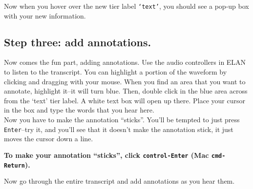\documentclass[letterpaper,12pt]{article}
\begin{document}
\noindent Now when you hover over the new tier label \texttt{`text'}, you should see a pop-up box with your new information.

\subsection*{Step three: add annotations.}
Now comes the fun part, adding annotations. Use the audio controllers in ELAN to listen to the transcript. You can highlight a portion of the waveform by clicking and dragging with your mouse. When you find an area that you want to annotate, highlight it--it will turn blue. Then, double click in the blue area across from the `text' tier label. A white text box will open up there. Place your cursor in the box and type the words that you hear here.\\

\noindent Now you have to make the annotation ``sticks''. You'll be tempted to just press \texttt{Enter}--try it, and you'll see that it doesn't make the annotation stick, it just moves the cursor down a line.

\begin{center}
\textbf{To make your annotation ``sticks'', click \texttt{control-Enter} (Mac \texttt{cmd-Return}).}
\end{center}

\noindent Now go through the entire transcript and add annotations as you hear them.
\end{document}
